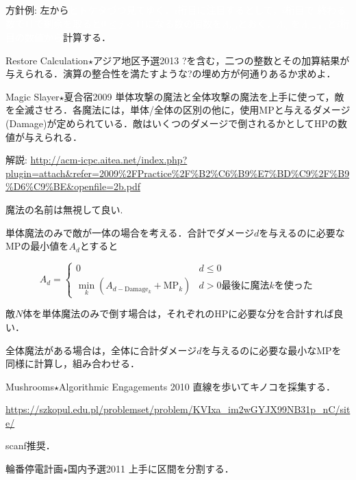 方針例: 左から\textcolor{white}{ヒトケタづつ見てゆく．$i$桁目に注目するとして，$i$桁目で
終わる数で11で剰余を取ると$0\le j<11$になる数の個数を$A_{i,j}$とおく．$A_{i,.}$を$A_{i-1,.}$と$i$桁目の数値から}計算する．

\begin{pbox}{Restore Calculation$\star$}{アジア地区予選2013}
?を含む，二つの整数とその加算結果が与えられる．演算の整合性を満たすような?の埋め方が何通りあるか求めよ．

\end{pbox}

\begin{pbox}{Magic Slayer$\star$}{夏合宿2009}
単体攻撃の魔法と全体攻撃の魔法を上手に使って，敵を全滅させろ．各魔法には，単体/全体の区別の他に，使用MPと与えるダメージ(Damage)が定められている．敵はいくつのダメージで倒されるかとしてHPの数値が与えられる．

\end{pbox}

解説: \url{http://acm-icpc.aitea.net/index.php?plugin=attach&refer=2009%2FPractice%2F%B2%C6%B9%E7%BD%C9%2F%B9%D6%C9%BE&openfile=2b.pdf}

魔法の名前は無視して良い. 

単体魔法のみで敵が一体の場合を考える．合計でダメージ$d$を与えるのに必要なMPの最小値を$A_d$とすると

\begin{equation}
  A_d = \left\{
  \begin{array}{ll}
    0 & d\le 0\\
    \min_k(A_{d-\mbox{Damage}_k} + \mbox{MP}_k) & d > 0 \mbox{最後に魔法$k$を使った}
  \end{array}\right.
\end{equation}

敵$N$体を単体魔法のみで倒す場合は，それぞれのHPに必要な分を合計すれば良い．

全体魔法がある場合は，全体に合計ダメージ$d$を与えるのに必要な最小なMPを同様に計算し，組み合わせる．

\begin{pbox}{Mushrooms$\star$}{Algorithmic Engagements 2010}
直線を歩いてキノコを採集する．

\url{https://szkopul.edu.pl/problemset/problem/KVIxa_im2wGYJX99NB31p_nC/site/}
\end{pbox}

scanf推奨．


\begin{pbox}{輪番停電計画$\star$}{国内予選2011}
上手に区間を分割する．

\end{pbox}

